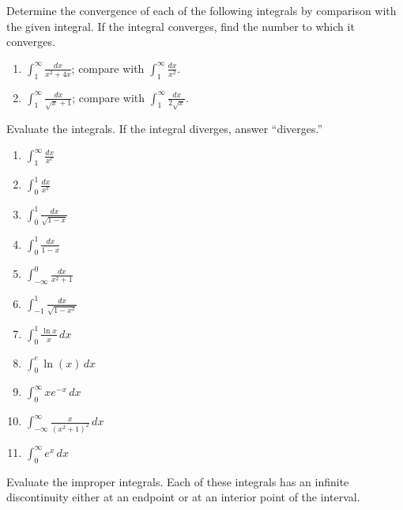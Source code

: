 \documentclass{exercises}
\begin{document}
Determine the convergence of each of the following integrals by comparison with the given integral. If the integral converges, find the number to which it converges.

\begin{enumerate}[resume]
\item $\int_{1}^{\infty}\frac{dx}{x^{2}+4x}$; compare with $\int_{1}^{\infty}\frac{dx}{x^{2}}$.
\item $\int_{1}^{\infty}\frac{dx}{\sqrt{x}+1}$; compare with $\int_{1}^{\infty}\frac{dx}{2\sqrt{x}}$.
\end{enumerate}

Evaluate the integrals. If the integral diverges, answer ``diverges.''

\begin{enumerate}[resume]
\item $\int_{1}^{\infty}\frac{dx}{x^{e}}$
\item $\int_{0}^{1}\frac{dx}{x^{\pi}}$
\item $\int_{0}^{1}\frac{dx}{\sqrt{1-x}}$
\item $\int_{0}^{1}\frac{dx}{1-x}$
\item $\int_{-\infty}^{0}\frac{dx}{x^{2}+1}$
\item $\int_{-1}^{1}\frac{dx}{\sqrt{1-x^{2}}}$
\item $\int_{0}^{1}\frac{\ln x}{x}\,dx$
\item $\int_{0}^{e}\ln(x)\,dx$
\item $\int_{0}^{\infty}xe^{-x}\,dx$
\item $\int_{-\infty}^{\infty}\frac{x}{{(x^{2}+1)}^{2}}\,dx$
\item $\int_{0}^{\infty}e^{x}\,dx$
\end{enumerate}

Evaluate the improper integrals. Each of these integrals has an infinite discontinuity either at an endpoint or at an interior point of the interval.
\end{document}
